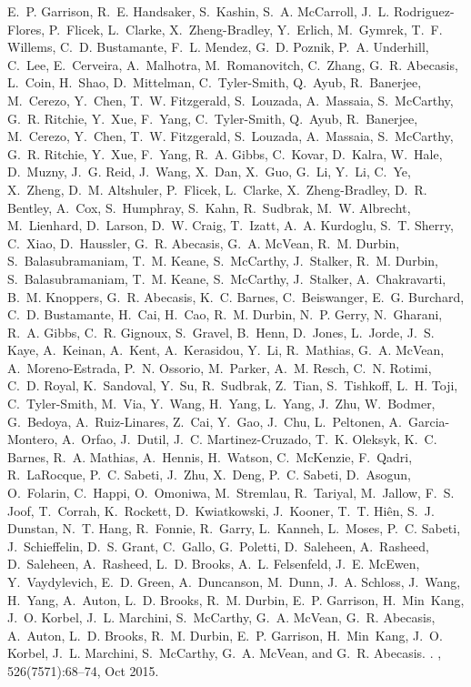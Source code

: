 \documentclass[webpdf,contemporary,large,single]{oup-authoring-template}%
\theoremstyle{thmstyleone}%
\theoremstyle{thmstyletwo}%
\theoremstyle{thmstylethree}%
\begin{document}
\begin{thebibliography}{10}
  E.~P. Garrison, R.~E. Handsaker, S.~Kashin, S.~A. McCarroll, J.~L.
  Rodriguez-Flores, P.~Flicek, L.~Clarke, X.~Zheng-Bradley, Y.~Erlich,
  M.~Gymrek, T.~F. Willems, C.~D. Bustamante, F.~L. Mendez, G.~D. Poznik, P.~A.
  Underhill, C.~Lee, E.~Cerveira, A.~Malhotra, M.~Romanovitch, C.~Zhang, G.~R.
  Abecasis, L.~Coin, H.~Shao, D.~Mittelman, C.~Tyler-Smith, Q.~Ayub,
  R.~Banerjee, M.~Cerezo, Y.~Chen, T.~W. Fitzgerald, S.~Louzada, A.~Massaia,
  S.~McCarthy, G.~R. Ritchie, Y.~Xue, F.~Yang, C.~Tyler-Smith, Q.~Ayub,
  R.~Banerjee, M.~Cerezo, Y.~Chen, T.~W. Fitzgerald, S.~Louzada, A.~Massaia,
  S.~McCarthy, G.~R. Ritchie, Y.~Xue, F.~Yang, R.~A. Gibbs, C.~Kovar, D.~Kalra,
  W.~Hale, D.~Muzny, J.~G. Reid, J.~Wang, X.~Dan, X.~Guo, G.~Li, Y.~Li, C.~Ye,
  X.~Zheng, D.~M. Altshuler, P.~Flicek, L.~Clarke, X.~Zheng-Bradley, D.~R.
  Bentley, A.~Cox, S.~Humphray, S.~Kahn, R.~Sudbrak, M.~W. Albrecht,
  M.~Lienhard, D.~Larson, D.~W. Craig, T.~Izatt, A.~A. Kurdoglu, S.~T. Sherry,
  C.~Xiao, D.~Haussler, G.~R. Abecasis, G.~A. McVean, R.~M. Durbin,
  S.~Balasubramaniam, T.~M. Keane, S.~McCarthy, J.~Stalker, R.~M. Durbin,
  S.~Balasubramaniam, T.~M. Keane, S.~McCarthy, J.~Stalker, A.~Chakravarti,
  B.~M. Knoppers, G.~R. Abecasis, K.~C. Barnes, C.~Beiswanger, E.~G. Burchard,
  C.~D. Bustamante, H.~Cai, H.~Cao, R.~M. Durbin, N.~P. Gerry, N.~Gharani,
  R.~A. Gibbs, C.~R. Gignoux, S.~Gravel, B.~Henn, D.~Jones, L.~Jorde, J.~S.
  Kaye, A.~Keinan, A.~Kent, A.~Kerasidou, Y.~Li, R.~Mathias, G.~A. McVean,
  A.~Moreno-Estrada, P.~N. Ossorio, M.~Parker, A.~M. Resch, C.~N. Rotimi, C.~D.
  Royal, K.~Sandoval, Y.~Su, R.~Sudbrak, Z.~Tian, S.~Tishkoff, L.~H. Toji,
  C.~Tyler-Smith, M.~Via, Y.~Wang, H.~Yang, L.~Yang, J.~Zhu, W.~Bodmer,
  G.~Bedoya, A.~Ruiz-Linares, Z.~Cai, Y.~Gao, J.~Chu, L.~Peltonen,
  A.~Garcia-Montero, A.~Orfao, J.~Dutil, J.~C. Martinez-Cruzado, T.~K. Oleksyk,
  K.~C. Barnes, R.~A. Mathias, A.~Hennis, H.~Watson, C.~McKenzie, F.~Qadri,
  R.~LaRocque, P.~C. Sabeti, J.~Zhu, X.~Deng, P.~C. Sabeti, D.~Asogun,
  O.~Folarin, C.~Happi, O.~Omoniwa, M.~Stremlau, R.~Tariyal, M.~Jallow, F.~S.
  Joof, T.~Corrah, K.~Rockett, D.~Kwiatkowski, J.~Kooner, T.~T. Hiên, S.~J.
  Dunstan, N.~T. Hang, R.~Fonnie, R.~Garry, L.~Kanneh, L.~Moses, P.~C. Sabeti,
  J.~Schieffelin, D.~S. Grant, C.~Gallo, G.~Poletti, D.~Saleheen, A.~Rasheed,
  D.~Saleheen, A.~Rasheed, L.~D. Brooks, A.~L. Felsenfeld, J.~E. McEwen,
  Y.~Vaydylevich, E.~D. Green, A.~Duncanson, M.~Dunn, J.~A. Schloss, J.~Wang,
  H.~Yang, A.~Auton, L.~D. Brooks, R.~M. Durbin, E.~P. Garrison, H.~Min~Kang,
  J.~O. Korbel, J.~L. Marchini, S.~McCarthy, G.~A. McVean, G.~R. Abecasis,
  A.~Auton, L.~D. Brooks, R.~M. Durbin, E.~P. Garrison, H.~Min~Kang, J.~O.
  Korbel, J.~L. Marchini, S.~McCarthy, G.~A. McVean, and G.~R. Abecasis.
.
, 526(7571):68--74, Oct 2015.


\end{thebibliography}
\end{document}

